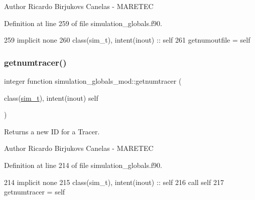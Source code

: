 \begin{DoxyAuthor}{Author}
Ricardo Birjukovs Canelas -\/ M\+A\+R\+E\+T\+EC 
\end{DoxyAuthor}


Definition at line 259 of file simulation\+\_\+globals.\+f90.


\begin{DoxyCode}
259     \textcolor{keywordtype}{implicit none}
260     \textcolor{keywordtype}{class}(sim\_t), \textcolor{keywordtype}{intent(inout)} :: self
261     getnumoutfile = self%
\end{DoxyCode}
\mbox{\label{namespacesimulation__globals__mod_a8314536e15b0e28f0072da22d2a2ecbf}} 
\subsubsection{\texorpdfstring{getnumtracer()}{getnumtracer()}}
{\footnotesize\ttfamily integer function simulation\+\_\+globals\+\_\+mod\+::getnumtracer (\begin{DoxyParamCaption}\item[{class(\mbox{\hyperlink{structsimulation__globals__mod_1_1sim__t}{sim\+\_\+t}}), intent(inout)}]{self }\end{DoxyParamCaption})\hspace{0.3cm}{\ttfamily [private]}}



Returns a new ID for a Tracer. 

\begin{DoxyAuthor}{Author}
Ricardo Birjukovs Canelas -\/ M\+A\+R\+E\+T\+EC 
\end{DoxyAuthor}


Definition at line 214 of file simulation\+\_\+globals.\+f90.


\begin{DoxyCode}
214     \textcolor{keywordtype}{implicit none}
215     \textcolor{keywordtype}{class}(sim\_t), \textcolor{keywordtype}{intent(inout)} :: self
216     \textcolor{keyword}{call }self%
217     getnumtracer = self%
\end{DoxyCode}
\mbox{\label{namespacesimulation__globals__mod_a4e649e57b574f384eeca405a4c3c10b0}} 
